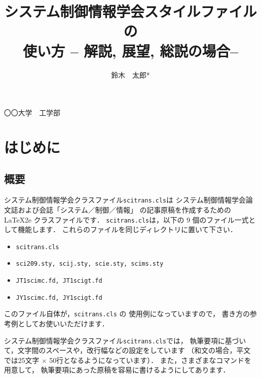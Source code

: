 \documentclass[J]{scitrans}
\begin{document}
\title{システム制御情報学会スタイルファイルの\\ 使い方\quad
  -- 解説, 展望, 総説の場合--}
\author{鈴木　太郎*}


\maketitle


\address{*}{〇〇大学　工学部}


\section{はじめに}
\label{sec:introduction}

\subsection{概要}

システム制御情報学会クラスファイル{\tt scitrans.cls}は
システム制御情報学会論文誌および会誌「システム／制御／情報」
の記事原稿を作成するための \LaTeX2e クラスファイルです．
{\tt scitrans.cls}は，以下の 9 個のファイル一式として機能します．
これらのファイルを同じディレクトリに置いて下さい．
\begin{itemize}
\item {\tt scitrans.cls}
\item {\tt sci209.sty, scij.sty, scie.sty, scims.sty}
\item {\tt JT1scimc.fd, JT1scigt.fd}
\item {\tt JY1scimc.fd, JY1scigt.fd}
\end{itemize}
このファイル自体が，{\tt scitrans.cls} の
使用例になっていますので，
書き方の参考例としてお使いいただけます．

システム制御情報学会クラスファイル{\tt scitrans.cls}では，
執筆要項に基づいて，文字間のスペースや，改行幅などの設定をしています
（和文の場合，平文では25文字 $\times$ 50行となるようになっています）．
また，さまざまなコマンドを用意して，
執筆要項にあった原稿を容易に書けるようにしてあります．
\end{document}
